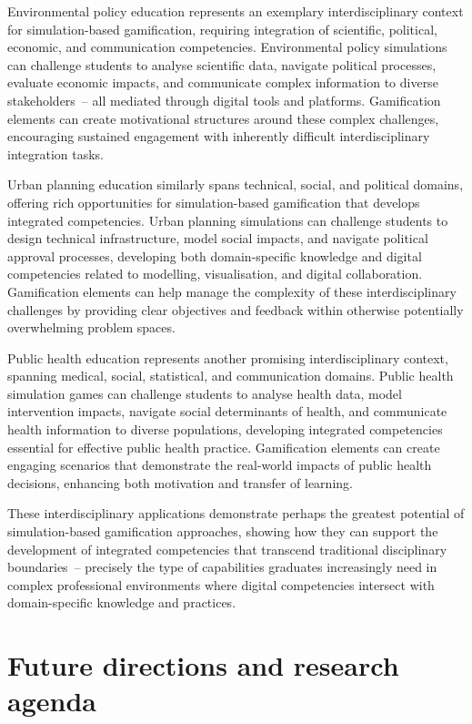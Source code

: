 \documentclass[cte]{acnsart}
\begin{document}
Environmental policy education represents an exemplary interdisciplinary context for simulation-based gamification, requiring integration of scientific, political, economic, and communication competencies. Environmental policy simulations can challenge students to analyse scientific data, navigate political processes, evaluate economic impacts, and communicate complex information to diverse stakeholders~-- all mediated through digital tools and platforms. Gamification elements can create motivational structures around these complex challenges, encouraging sustained engagement with inherently difficult interdisciplinary integration tasks.

Urban planning education similarly spans technical, social, and political domains, offering rich opportunities for simulation-based gamification that develops integrated competencies. Urban planning simulations can challenge students to design technical infrastructure, model social impacts, and navigate political approval processes, developing both domain-specific knowledge and digital competencies related to modelling, visualisation, and digital collaboration. Gamification elements can help manage the complexity of these interdisciplinary challenges by providing clear objectives and feedback within otherwise potentially overwhelming problem spaces.

Public health education represents another promising interdisciplinary context, spanning medical, social, statistical, and communication domains. Public health simulation games can challenge students to analyse health data, model intervention impacts, navigate social determinants of health, and communicate health information to diverse populations, developing integrated competencies essential for effective public health practice. Gamification elements can create engaging scenarios that demonstrate the real-world impacts of public health decisions, enhancing both motivation and transfer of learning.

These interdisciplinary applications demonstrate perhaps the greatest potential of simulation-based gamification approaches, showing how they can support the development of integrated competencies that transcend traditional disciplinary boundaries~-- precisely the type of capabilities graduates increasingly need in complex professional environments where digital competencies intersect with domain-specific knowledge and practices.

\section{Future directions and research agenda\label{sec7}}
\end{document}
